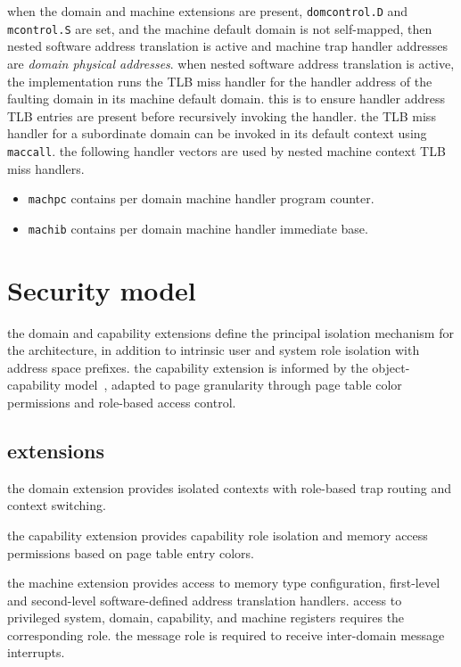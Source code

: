 when the domain and machine extensions are present,
\texttt{domcontrol.D} and \texttt{mcontrol.S} are set, and the
machine default domain is not self-mapped, then nested software address
translation is active and machine trap handler addresses are
\emph{domain physical addresses}. when nested software address
translation is active, the implementation runs the TLB miss handler for
the handler address of the faulting domain in its machine default domain.
this is to ensure handler address TLB entries are present before
recursively invoking the handler.
the TLB miss handler for a subordinate domain can be invoked in its
default context using \texttt{maccall}.
\para
the following handler vectors are used by nested machine context TLB miss handlers.
\begin{itemize}[itemsep=0pt]
\item \texttt{machpc} contains per domain machine handler program counter.
\item \texttt{machib} contains per domain machine handler immediate base.
\end{itemize}

\newpage
\section{Security model}

the domain and capability extensions define the principal isolation
mechanism for the architecture, in addition to intrinsic user
and system role isolation with address space prefixes.
the capability extension is informed by the object-capability
model~\cite{levy1984capability}, adapted to page granularity through
page table color permissions and role-based access control.

\subsection{extensions}

the domain extension provides isolated contexts with role-based trap
routing and context switching.
\iffalse
the capability extension provides role-based instruction execution
and memory access permissions based on page table entry colors.
\else
the capability extension provides capability role isolation and memory
access permissions based on page table entry colors.
\fi
the machine extension provides access to memory type configuration,
first-level and second-level software-defined address translation handlers.
access to privileged system, domain, capability, and machine registers
requires the corresponding role.
the message role is required to receive inter-domain message interrupts.

